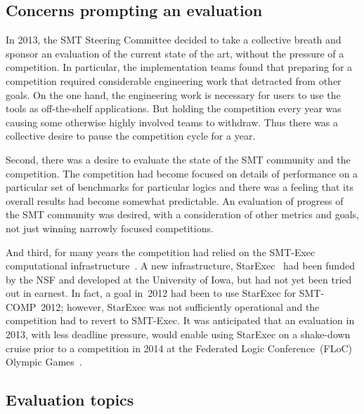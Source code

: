\documentclass[smallcondensed]{svjour3}
\begin{document}
\subsection{Concerns prompting an evaluation}

In 2013, the SMT Steering Committee decided to take a collective breath and sponsor an evaluation of the current state of the art, without the pressure of a competition. In particular, the implementation teams found that preparing for a competition required considerable engineering work that detracted from other goals. On the one hand, the engineering work is necessary for users to use the tools as off-the-shelf applications. But holding the competition every year was causing some otherwise highly involved teams to withdraw. Thus there was a collective desire to pause the competition cycle for a year.

Second, there was a desire to evaluate the state of the SMT community and the competition. The competition had become focused on details of performance on a particular set of benchmarks for particular logics and there was a feeling that its overall results had become somewhat predictable. An evaluation of progress of the SMT community was desired, with a consideration of other metrics and goals, not just winning narrowly focused competitions.
 
And third, for many years the competition had relied on the SMT-Exec computational infrastructure~\cite{springerlink:10.1007/s10817-012-9246-5}.  A new infrastructure, StarExec~\cite{StuST-IJCAR-14,webStarExec} had been funded by the NSF and developed at the University of Iowa, but had not yet been tried out in earnest.  In fact, a goal in~2012 had been to use StarExec for SMT-COMP~2012; however, StarExec was not sufficiently operational and the competition had to revert to SMT-Exec.  It was anticipated that an evaluation in 2013, with less deadline pressure, would enable using StarExec on a shake-down cruise prior to a competition in 2014 at the Federated Logic Conference~(FLoC) Olympic Games~\cite{webOlympicGames}.

\subsection{Evaluation topics}
\end{document}
